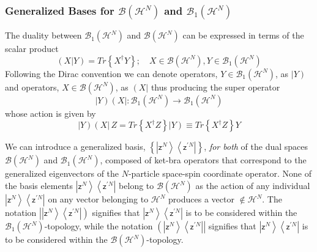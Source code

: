 \documentclass[aps,preprint]{revtex4}%
\begin{document}
\subsubsection{Generalized Bases for $\mathcal{B}\left(  \mathcal{H}%
^{N}\right)  $ and $\mathcal{B}_{1}\left(  \mathcal{H}^{N}\right)  $}

The duality between $\mathcal{B}_{1}\left(  \mathcal{H}^{N}\right)  $ and
$\mathcal{B}\left(  \mathcal{H}^{N}\right)  $ can be expressed in terms of the
scalar product
\begin{equation}
\left(  X|Y\right)  =Tr\left\{  X^{\dagger}Y\right\}  ;\quad X\in
\mathcal{B}\left(  \mathcal{H}^{N}\right)  ,Y\in\mathcal{B}_{1}\left(
\mathcal{H}^{N}\right)
\end{equation}
Following the Dirac convention we can denote operators, $Y\in\mathcal{B}%
_{1}\left(  \mathcal{H}^{N}\right)  $, as $\left\vert Y\right)  $ and
operators, $X\in\mathcal{B}\left(  \mathcal{H}^{N}\right)  $, as $\left(
X\right\vert $ thus producing the super operator%
\begin{equation}
\left\vert Y\right)  \left(  X\right\vert :\mathcal{B}_{1}\left(
\mathcal{H}^{N}\right)  \rightarrow\mathcal{B}_{1}\left(  \mathcal{H}%
^{N}\right)
\end{equation}
whose action is given by
\begin{equation}
\left\vert Y\right)  \left(  X\right\vert \,Z=Tr\left\{  X^{\dagger}Z\right\}
\left\vert Y\right)  \equiv Tr\left\{  X^{\dagger}Z\right\}  Y
\end{equation}


We can introduce a generalized basis, $\left\{  \left\vert \mathsf{z}%
^{N}\right\rangle \left\langle \mathsf{z}^{\prime N}\right\vert \right\}  $,
\emph{for both} of the dual spaces $\mathcal{B}\left(  \mathcal{H}^{N}\right)
$ and $\mathcal{B}_{1}\left(  \mathcal{H}^{N}\right)  $, composed of ket-bra
operators that correspond to the generalized eigenvectors of the $N$-particle
space-spin coordinate operator. None of the basis elements $\left\vert
\mathsf{z}^{N}\right\rangle \left\langle \mathsf{z}^{\prime N}\right\vert $
belong to $\mathcal{B}\left(  \mathcal{H}^{N}\right)  $ as the action of any
individual $\left\vert \mathsf{z}^{N}\right\rangle \left\langle \mathsf{z}%
^{\prime N}\right\vert $ on any vector belonging to $\mathcal{H}^{N}$ produces
a vector $\notin\mathcal{H}^{N}$. The notation $\left\vert \left\vert
\mathsf{z}^{N}\right\rangle \left\langle \mathsf{z}^{\prime N}\right\vert
\right)  $ signifies that $\left\vert \mathsf{z}^{N}\right\rangle \left\langle
\mathsf{z}^{\prime N}\right\vert $ is to be considered within the
$\mathcal{B}_{1}\left(  \mathcal{H}^{N}\right)  $-topology, while the notation
$\left(  \left\vert \mathsf{z}^{N}\right\rangle \left\langle \mathsf{z}%
^{\prime N}\right\vert \right\vert $ signifies that $\left\vert \mathsf{z}%
^{N}\right\rangle \left\langle \mathsf{z}^{\prime N}\right\vert $ is to be
considered within the $\mathcal{B}\left(  \mathcal{H}^{N}\right)  $-topology.
\end{document}
